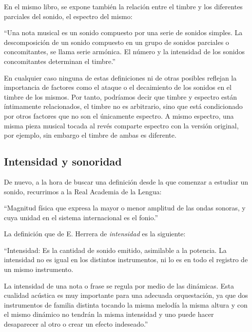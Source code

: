 \documentclass[11pt,a4paper]{article}
\begin{document}
	 En el mismo libro, se expone también la relación entre el timbre y los diferentes parciales del sonido, el espectro del mismo:
	 
	 \begin{center}
	 	``Una nota musical es un sonido compuesto por una serie de sonidos simples. La descomposición de un sonido compuesto en un grupo de sonidos parciales o concomitantes, se llama serie armónica. El número y la intensidad de los sonidos concomitantes determinan el timbre.''
	 \end{center}
	 
	 En cualquier caso ninguna de estas definiciones ni de otras posibles reflejan la importancia de factores como el ataque o el decaimiento de los sonidos en el timbre de los mismos.
	 Por tanto, podríamos decir que timbre y espectro están íntimamente relacionados, el timbre no es arbitrario, sino que está condicionado por otros factores que no son el únicamente espectro. A mismo espectro, una misma pieza musical tocada al revés comparte espectro con la versión original, por ejemplo, sin embargo el timbre de ambas es diferente.
	 
	\subsection{Intensidad y sonoridad}
	
	De nuevo, a la hora de buscar una definición desde la que comenzar a estudiar un sonido, recurrimos a la Real Academia de la Lengua:
	
	\begin{center}
	    ``Magnitud física que expresa la mayor o menor amplitud de las ondas sonoras, y cuya unidad en el sistema internacional es el fonio.''
	\end{center}
	
	La definición que de E. Herrera \cite{EH} de \emph{intensidad} es la siguiente:
	
	\begin{center}
	``Intensidad: Es la cantidad de sonido emitido, asimilable a la potencia. La intensidad no es igual en los distintos instrumentos, ni lo es en todo el registro de un mismo instrumento.
	
	La intensidad de una nota o frase se regula por medio de las dinámicas. Esta cualidad acústica es muy importante para una adecuada orquestación, ya que dos instrumentos de familia distinta tocando la misma melodía la misma altura y con el mismo dinámico no tendrán la misma intensidad y uno puede hacer desaparecer al otro o crear un efecto indeseado.''
	\end{center}
	
\end{document}
